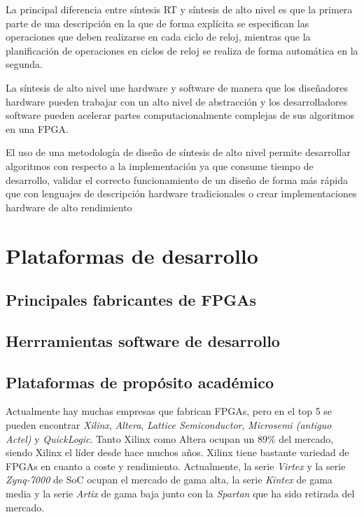 La principal diferencia entre síntesis RT y síntesis de alto nivel es que la primera parte de una descripción en la que de forma 
explícita se especifican las operaciones que deben realizarse en cada ciclo de reloj, mientras que la planificación de operaciones 
en ciclos de reloj se realiza de forma automática en la segunda.

La síntesis de alto nivel une hardware y software de manera que los diseñadores hardware pueden trabajar con un alto nivel de abstracción 
y los desarrolladores software pueden acelerar partes computacionalmente complejas de sus algoritmos en una FPGA. 

El uso de una metodología de diseño de síntesis de alto nivel permite desarrollar algoritmos con respecto a la implementación ya que 
consume tiempo de desarrollo, validar el correcto funcionamiento de un diseño de forma más rápida que con lenguajes de descripción 
hardware tradicionales o crear implementaciones hardware de alto rendimiento

\section{Plataformas de desarrollo} 

\subsection{Principales fabricantes de FPGAs}

\subsection{Herrramientas software de desarrollo}

\subsection{Plataformas de propósito académico}

Actualmente hay muchas empresas que fabrican FPGAs, pero en el top 5 se pueden encontrar \textit{Xilinx}, \textit{Altera}, 
\textit{Lattice Semiconductor}, \textit{Microsemi (antiguo Actel)} y \textit{QuickLogic}. Tanto Xilinx como Altera ocupan un 89\% 
del mercado, siendo Xilinx el líder desde hace muchos años. Xilinx tiene bastante variedad de FPGAs en cuanto a coste y rendimiento. 
Actualmente, la serie \textit{Virtex} y la serie \textit{Zynq-7000} de SoC ocupan el mercado de gama alta, la serie \textit{Kintex} 
de gama media y la serie \textit{Artix} de gama baja junto con la \textit{Spartan} que ha sido retirada del mercado.

